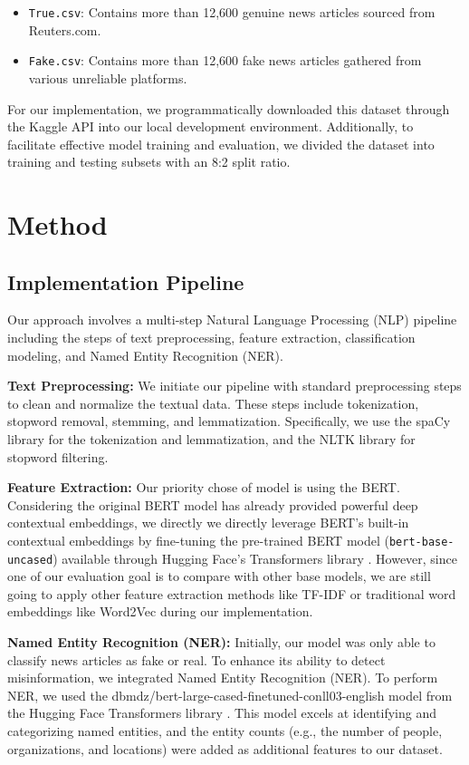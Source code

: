 \documentclass[11pt,a4paper]{article}
\begin{document}
\begin{itemize}
    \item \texttt{True.csv}: Contains more than 12,600 genuine news articles sourced from Reuters.com.
    \item \texttt{Fake.csv}: Contains more than 12,600 fake news articles gathered from various unreliable platforms.
\end{itemize}

For our implementation, we programmatically downloaded this dataset through the Kaggle API into our local development environment. Additionally, to facilitate effective model training and evaluation, we divided the dataset into training and testing subsets with an 8:2 split ratio.

\section{Method}

\subsection{Implementation Pipeline}

Our approach involves a multi-step Natural Language Processing (NLP) pipeline including the steps of text preprocessing, feature extraction, classification modeling, and Named Entity Recognition (NER).

\textbf{Text Preprocessing:} We initiate our pipeline with standard preprocessing steps to clean and normalize the textual data. 
These steps include tokenization, stopword removal, stemming, and lemmatization. Specifically, we use the spaCy library for the tokenization and lemmatization, 
and the NLTK library for stopword filtering.

\textbf{Feature Extraction:} Our priority chose of model is using the BERT. Considering the original BERT model has already provided powerful deep contextual embeddings, 
we directly we directly leverage BERT's built-in contextual embeddings by fine-tuning the pre-trained BERT model (\texttt{bert-base-uncased}) available through Hugging Face's Transformers library \cite{DBLP:journals/corr/abs-1810-04805}. 
However, since one of our evaluation goal is to compare with other base models, we are still going to apply other feature extraction methods like TF-IDF or traditional word embeddings like Word2Vec during our implementation. 

\textbf{Named Entity Recognition (NER):} Initially, our model was only able to classify news articles as fake or real. To enhance its ability to detect misinformation, we integrated Named Entity Recognition (NER). 
To perform NER, we used the dbmdz/bert-large-cased-finetuned-conll03-english model from the Hugging Face Transformers library \cite{dbmdz_bert_large_cased_conll03}. This model excels at identifying and categorizing named entities, and the entity counts (e.g., the number of people, organizations, and locations) were added as additional features to our dataset.
\end{document}
